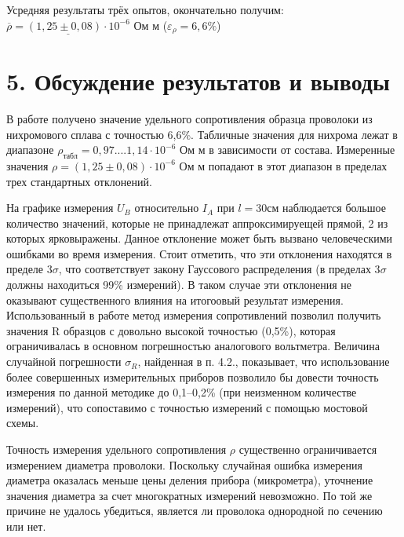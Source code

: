 Усредняя результаты трёх опытов, окончательно получим:\\


$\underline{\overline{\rho} = (1,25 \pm 0,08)\cdot{10^{-6}}}$ Ом м ($\varepsilon_{\rho} = 6,6\%$)\


\section*{5. Обсуждение результатов и выводы}


В работе получено значение удельного сопротивления образца проволоки из нихромового сплава с точностью 6,6\%. Табличные значения для нихрома лежат в диапазоне $\rho_{табл} = 0,97 .... 1,14\cdot10^{-6}$ Ом м в зависимости от состава. Измеренные значения $\rho = (1,25 \pm 0,08) \cdot 10^{-6}$ Ом м попадают в этот диапазон в пределах трех стандартных отклонений. 


На графике измерения $U_B$ относительно $I_A$ при $l = 30$см наблюдается большое количество значений, которые не принадлежат аппроксимируещей прямой, 2 из которых ярковыражены. Данное отклонение может быть вызвано человеческими ошибками во время измерения. Стоит отметить, что эти отклонения находятся в пределе 3$\sigma$, что соответствует закону Гауссового распределения (в пределах 3$\sigma$ должны находиться 99\% измерений). В таком случае эти отклонения не оказывают существенного влияния на итогоовый результат измерения.\
\\

Использованный в работе метод измерения сопротивлений позволил получить значения R образцов с довольно высокой точностью (0,5\%), которая ограничивалась в основном погрешностью аналогового вольтметра. Величина случайной погрешности $\sigma_{R}$, найденная в п. 4.2., показывает, что использование более совершенных измерительных приборов позволило бы довести точность измерения по данной методике до 0,1–0,2\% (при неизменном количестве измерений), что сопоставимо с точностью измерений с помощью мостовой схемы.


Точность измерения удельного сопротивления $\rho$ существенно ограничивается измерением диаметра проволоки. Поскольку случайная ошибка измерения диаметра оказалась меньше цены деления прибора (микрометра), уточнение значения диаметра за счет многократных измерений невозможно. По той же причине не удалось убедиться, является ли проволока однородной по сечению или нет.



